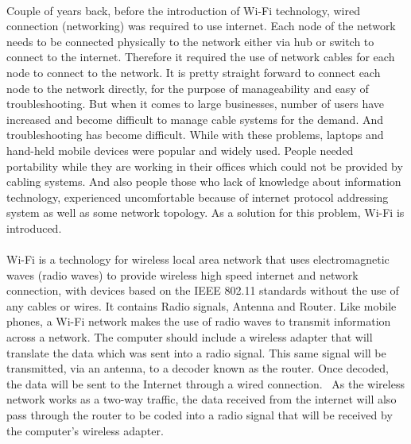 \paragraph{}
Couple of years back, before the introduction of Wi-Fi technology, wired connection (networking) was required to use internet. Each node of the network needs to be connected physically to the network either via hub or switch to connect to the internet. Therefore it required the use of network cables for each node to connect to the network. It is pretty straight forward to connect each node to the network directly, for the purpose of manageability and easy of troubleshooting. But when it comes to large businesses, number of users have increased and become difficult to manage cable systems for the demand. And troubleshooting has become difficult. While with these problems, laptops and hand-held mobile devices were popular and widely used. People needed portability while they are working in their offices which could not be provided by cabling systems. And also people those who lack of knowledge about information technology, experienced uncomfortable because of internet protocol addressing system as well as some network topology. As a solution for this problem, Wi-Fi is introduced.

\paragraph{}
Wi-Fi is a technology for wireless local area network that uses electromagnetic waves (radio waves) to provide wireless high speed internet and network connection\cite{wifi_d}, with devices based on the IEEE 802.11 standards without the use of any cables or wires. It contains Radio signals, Antenna and Router. Like mobile phones, a Wi-Fi network makes the use of radio waves to transmit information across a network. The computer should include a wireless adapter that will translate the data which was sent into a radio signal. This same signal will be transmitted, via an antenna, to a decoder known as the router. Once decoded, the data will be sent to the Internet through a wired connection.  As the wireless network works as a two-way traffic, the data received from the internet will also pass through the router to be coded into a radio signal that will be received by the computer's wireless adapter. \cite{wifi_1}

